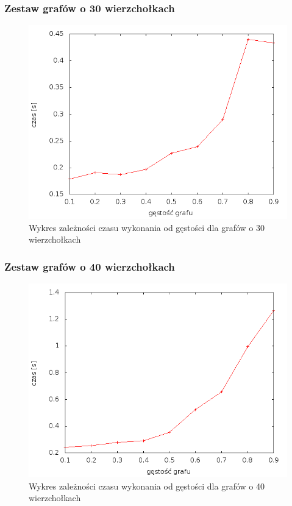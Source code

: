 \documentclass[12pt, a4paper]{article}
\begin{document}
\subsubsection*{Zestaw grafów o 30 wierzchołkach}
\begin{figure}[!h]
    \begin{center}
	\includegraphics[scale=0.5]{results/img/dim/dim_30.png}
	\caption{Wykres zależności czasu wykonania od gęstości dla grafów o 30 wierzchołkach}
    \end{center}
\end{figure}
\FloatBarrier
\subsubsection*{Zestaw grafów o 40 wierzchołkach}
\begin{figure}[!h]
    \begin{center}
	\includegraphics[scale=0.5]{results/img/dim/dim_40.png}
	\caption{Wykres zależności czasu wykonania od gęstości dla grafów o 40 wierzchołkach}
    \end{center}
\end{figure}
\FloatBarrier
\newpage
\end{document}
